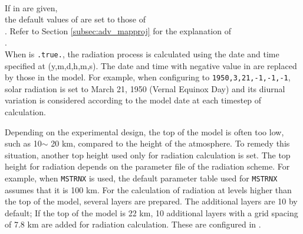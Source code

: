 \\

If  in  are given,\\
the default values of  are set to those of \\
.
Refer to Section \ref{subsec:adv_mapproj} for the explanation of \\
.\\
%
When  is \verb|.true.|,
the radiation process is calculated using the date and time specified at  (y,m,d,h,m,s).
The date and time with negative value in  are replaced by those in the model.
For example,
when configuring  to \verb|1950,3,21,-1,-1,-1|,
solar radiation is set to March 21, 1950 (Vernal Equinox Day) and
its diurnal variation is considered
according to the model date at each timestep of calculation.




Depending on the experimental design, the top of the model is often too low, such as 10$\sim$ 20 km, compared to the height of the atmosphere.
To remedy this situation, another top height used only for radiation calculation is set.
The top height for radiation depends on the parameter file of the radiation scheme.
For example, when \verb|MSTRNX| is used, the default parameter table used for \verb|MSTRNX| assumes that it is 100 km.
%
For the calculation of radiation at levels higher than the top of the model, several layers are prepared.
The additional layers are 10 by default;
If the top of the model is 22 km, 10 additional layers with a grid spacing of 7.8 km are added for radiation calculation.
These are configured in .\\

